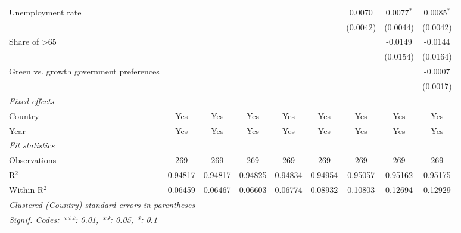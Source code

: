 \begin{table}[htbp]
\begin{tabular}{lcccccccc}
      Unemployment rate                                        &               &               &          &          &              & 0.0070   & 0.0077$^{*}$ & 0.0085$^{*}$\\   
                                                               &               &               &          &          &              & (0.0042) & (0.0044)     & (0.0042)\\   
      Share of >65                                             &               &               &          &          &              &          & -0.0149      & -0.0144\\   
                                                               &               &               &          &          &              &          & (0.0154)     & (0.0164)\\   
      Green vs. growth government preferences                  &               &               &          &          &              &          &              & -0.0007\\   
                                                               &               &               &          &          &              &          &              & (0.0017)\\   
      \midrule
      \emph{Fixed-effects}\\
      Country                                                  & Yes           & Yes           & Yes      & Yes      & Yes          & Yes      & Yes          & Yes\\  
      Year                                                     & Yes           & Yes           & Yes      & Yes      & Yes          & Yes      & Yes          & Yes\\  
      \midrule
      \emph{Fit statistics}\\
      Observations                                             & 269           & 269           & 269      & 269      & 269          & 269      & 269          & 269\\  
      R$^2$                                                    & 0.94817       & 0.94817       & 0.94825  & 0.94834  & 0.94954      & 0.95057  & 0.95162      & 0.95175\\  
      Within R$^2$                                             & 0.06459       & 0.06467       & 0.06603  & 0.06774  & 0.08932      & 0.10803  & 0.12694      & 0.12929\\  
      \midrule \midrule
      \multicolumn{9}{l}{\emph{Clustered (Country) standard-errors in parentheses}}\\
      \multicolumn{9}{l}{\emph{Signif. Codes: ***: 0.01, **: 0.05, *: 0.1}}\\
   \end{tabular}
\end{table}


